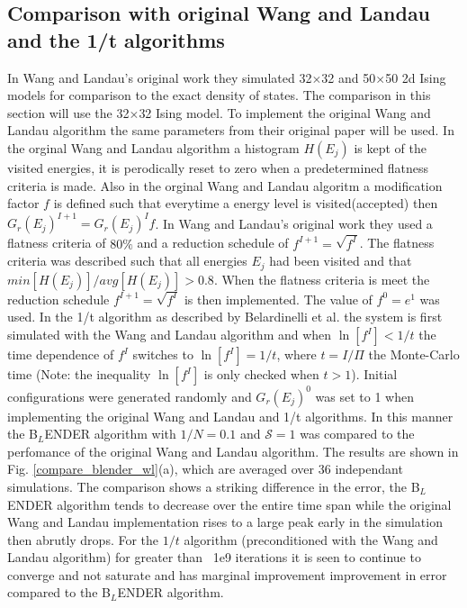 \documentclass[aps,pre,reprint,superscriptaddress,showkeys]{revtex4-2}
\begin{document}
\subsection{Comparison with original Wang and Landau  and the 1/t algorithms}
In Wang and Landau's original work they simulated  32$\times$32 and 50$\times$50 2d Ising models for comparison to the exact density of states. The comparison in this section will use the 32$\times$32 Ising model. To implement the original Wang and Landau algorithm the same parameters from their original paper will be used\cite{WL_phys_rev_lett}. In the orginal Wang and Landau algorithm a histogram $H(E_j)$ is kept of the visited energies, it is perodically reset to zero when a predetermined flatness criteria is made. Also in the orginal Wang and Landau algoritm a  modification factor $f$ is defined such that everytime a energy level is visited(accepted) then $G_r(E_j)^{I+1} = G_r(E_j)^{I}f$. In Wang and Landau's original work they used a flatness criteria of $80\%$ and a reduction schedule of $f^{I+1}= \sqrt{f^{I}}$. The flatness criteria was described such that all energies $E_j$ had been visited and that  $min[H(E_j)]/avg[H(E_j)] > 0.8$. When the flatness criteria is meet the reduction schedule $f^{I+1}= \sqrt{f^{I}}$ is then implemented. The value of $f^0 = e^1$ was used. In the 1/t algorithm as described by Belardinelli et al. \cite{saturation} the system is first simulated with the Wang and Landau algorithm and when $\ln[f^I]< 1/t$  the time dependence of $f^I$ switches to $\ln[f^I]=1/t$, where $t = I/\Pi$ the Monte-Carlo time (Note: the inequality $\ln[f^I]$ is only checked when $t>1$).  Initial configurations were generated randomly and $G_r(E_j)^0$ was set to 1 when implementing the original Wang and Landau and  1/t algorithms.  In  this manner the B$_L$ENDER algorithm with $1/N = 0.1$ and $\mathcal{S}=1$ was compared to the perfomance of the original Wang and Landau algorithm. The results are shown in Fig. \ref{compare_blender_wl}(a), which are averaged over 36 independant simulations. The comparison shows a striking difference in the error,  the B$_L$ENDER algorithm  tends to decrease over the entire time span while the original Wang and Landau implementation  rises to a large peak early in the simulation then abrutly drops. For the $1/t$ algorithm (preconditioned with the Wang and Landau algorithm) for greater than ~1e9 iterations it is seen to continue to converge and not saturate and has marginal improvement improvement in error compared to the B$_L$ENDER algorithm.    
\end{document}
